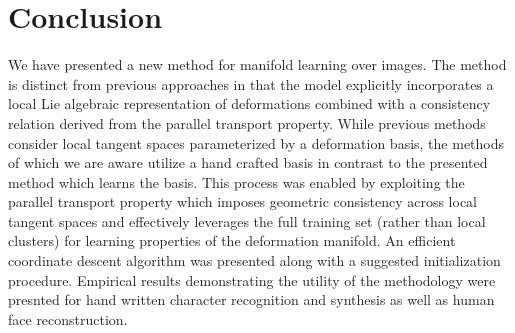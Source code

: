 
\section{Conclusion}
\label{sec:conclusion}
We have presented a new method for manifold learning over images. The
method is distinct from previous approaches in that the model
explicitly incorporates a local Lie algebraic representation of
deformations combined with a consistency relation derived from the
parallel transport property. While previous methods consider local
tangent spaces parameterized by a deformation basis, the methods of
which we are aware utilize a hand crafted basis in contrast to the
presented method which learns the basis. This process was enabled by
exploiting the parallel transport property which imposes geometric
consistency across local tangent spaces and effectively leverages the
full training set (rather than local clusters) for learning properties
of the deformation manifold. An efficient coordinate descent algorithm
was presented along with a suggested initialization
procedure. Empirical results demonstrating the utility of the
methodology were presnted for hand written character recognition and
synthesis as well as human face reconstruction.
%
